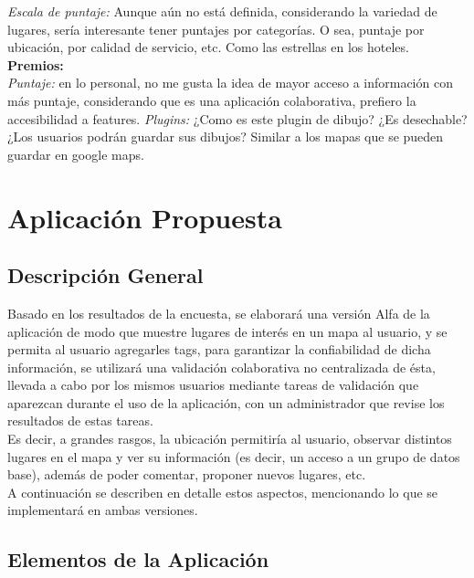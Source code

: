 \documentclass[10pt,letterpaper]{article}
\begin{document}
\textsl{Escala de puntaje:} Aunque aún no está definida, considerando la variedad de lugares, sería interesante tener puntajes por categorías. O sea, puntaje por ubicación, por calidad de servicio, etc. Como las estrellas en los hoteles.\\

\textbf{Premios:}\\

\textsl{Puntaje:} en lo personal, no me gusta la idea de mayor acceso a información con más puntaje, considerando que es una aplicación colaborativa, prefiero la accesibilidad a features.
\textsl{Plugins:} ¿Como es este plugin de dibujo? ¿Es desechable? ¿Los usuarios podrán guardar sus dibujos? Similar a los mapas que se pueden guardar en google maps.

\newpage
\section{Aplicación Propuesta}

\subsection{Descripción General}

Basado en los resultados de la encuesta, se elaborará una versión Alfa de la aplicación de modo que muestre lugares de interés en un mapa al usuario, y se permita al usuario agregarles tags, para garantizar la confiabilidad de dicha información, se utilizará una validación colaborativa no centralizada de ésta, llevada a cabo por los mismos usuarios mediante tareas de validación que aparezcan durante el uso de la aplicación, con un administrador que revise los resultados de estas tareas.\\

Es decir, a grandes rasgos, la ubicación permitiría al usuario, observar distintos lugares en el mapa y ver su información (es decir, un acceso a un grupo de datos base), además de poder comentar, proponer nuevos lugares, etc.\\

A continuación se describen en detalle estos aspectos, mencionando lo que se implementará en ambas versiones.\\

\subsection{Elementos de la Aplicación}
\end{document}
